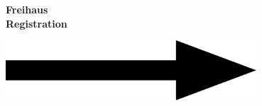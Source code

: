 \documentclass[a4paper]{article}
\begin{document}
\printGenericVSLHeader
\begin{center}
\begin{vsltext}{3cm}{3.5cm}

    \textbf{Freihaus}\\ 
    \textbf{Registration} 

    \vspace{1.5cm}

    \includegraphics[width=0.7\textwidth, keepaspectratio=true]{arrow_right.pdf}

\end{vsltext}

\end{center}
\end{document}
